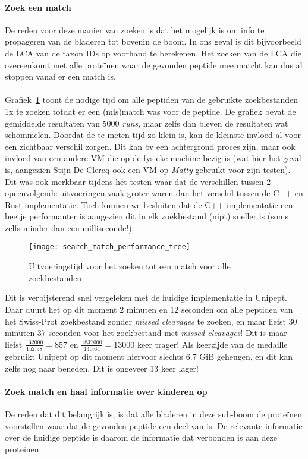 \paragraph{Zoek een match}
De reden voor deze manier van zoeken is dat het mogelijk is om info te propageren van de bladeren tot bovenin de boom.
In ons geval is dit bijvoorbeeld de LCA van de taxon IDs op voorhand te berekenen.
Het zoeken van de LCA die overeenkomt met alle proteïnen waar de gevonden peptide mee matcht kan dus al stoppen vanaf er een match is.
\\ \\
Grafiek~\ref{fig:performance_match_tree} toont de nodige tijd om alle peptiden van de gebruikte zoekbestanden 1x te zoeken totdat er een (mis)match was voor de peptide.
De grafiek bevat de gemiddelde resultaten van 5000 \textit{runs}, maar zelfs dan bleven de resultaten wat schommelen.
Doordat de te meten tijd zo klein is, kan de kleinste invloed al voor een zichtbaar verschil zorgen.
Dit kan bv een achtergrond proces zijn, maar ook invloed van een andere VM die op de fysieke machine bezig is (wat hier het geval is, aangezien Stijn De Clercq ook een VM op \textit{Matty} gebruikt voor zijn testen).
Dit was ook merkbaar tijdens het testen waar dat de verschillen tussen 2 opeenvolgende uitvoeringen vaak groter waren dan het verschil tussen de C++ en Rust implementatie.
Toch kunnen we besluiten dat de C++ implementatie een beetje performanter is aangezien dit in elk zoekbestand (nipt) sneller is (soms zelfs minder dan een milliseconde!).

\begin{figure}[H]
    \centering
    \texttt{[image: search\_match\_performance\_tree]}
    \caption{Uitvoeringstijd voor het zoeken tot een match voor alle zoekbestanden}
    \label{fig:performance_match_tree}
\end{figure}

Dit is verbijsterend snel vergeleken met de huidige implementatie in Unipept.
Daar duurt het op dit moment 2 minuten en 12 seconden om alle peptiden van het Swiss-Prot zoekbestand zonder \textit{missed cleavages} te zoeken,
en maar liefst 30 minuten 37 seconden voor het zoekbestand met \textit{missed cleavages}!
Dit is maar liefst $\frac{132 000}{152.98} = 857$ en $\frac{1 837 000}{140.64} = 13 000$ keer trager!
Als keerzijde van de medaille gebruikt Unipept op dit moment hiervoor slechts 6.7 GiB geheugen, en dit kan zelfs nog naar beneden.
Dit is ongeveer 13 keer lager!

\paragraph{Zoek match en haal informatie over kinderen op}
De reden dat dit belangrijk is, is dat alle bladeren in deze sub-boom de proteïnen voorstellen waar dat de gevonden peptide een deel van is.
De relevante informatie over de huidige peptide is daarom de informatie dat verbonden is aan deze proteïnen. %

